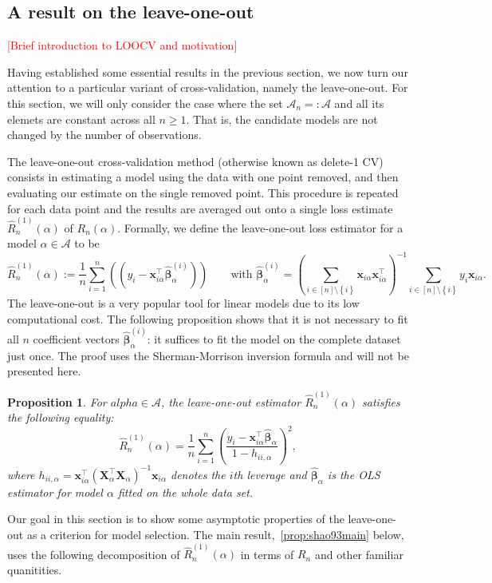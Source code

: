 \documentclass[11pt, letter paper]{article}
\newcommand{\1}{\mathmybb{1}}
\newtheorem{proposition}{Proposition}[section]
\newcommand{\0}{\emptyset}
\newcommand{\paren}[1]{\left(#1 \right)}
\newcommand{\set}[1]{\left\{ #1 \right\}}
\newcommand{\Acal}{\mathcal{A}_{n}}
\newcommand{\Tcal}{\mathcal{T}_{n}}
\newcommand{\X}{\boldsymbol{X}}
\newcommand{\x}{\boldsymbol{x}}
\newcommand{\bbetahat}{\boldsymbol{\hat{\beta}}}
\newcommand{\loocv}[1]{\hat{R}^{(1)}_{n}\paren{#1}}
\begin{document}
\subsection{A result on the leave-one-out}\label{sec:loo}
\renewcommand{\Acal}{\mathcal{A}}
\renewcommand{\Tcal}{\mathcal{T}}
\textcolor{red}{[Brief introduction to LOOCV and motivation]}

Having established some essential results in the previous section, we now turn our attention to a particular variant of cross-validation, namely the leave-one-out. For this section, we will only consider the case where the set \(\Acal_{n}=:\Acal\) and all its elemets are constant across all \(n\geq 1\). That is, the candidate models are not changed by the number of observations.

The leave-one-out cross-validation method (otherwise known as delete-1 CV) consists in estimating a model using the data with one point removed, and then evaluating our estimate on the single removed point. This procedure is repeated for each data point and the results are averaged out onto a single loss estimate \(\loocv{\alpha}\) of \(R_{n}(\alpha)\). Formally, we define the leave-one-out loss estimator for a model \(\alpha\in\Acal\) to be 
\[\loocv{\alpha} := \frac{1}{n}\sum_{i=1}^{n}\paren{(y_{i} - \x_{i\alpha}^{\top}\bbetahat_{\alpha}^{(i)})}\qquad\text{with }\bbetahat_{\alpha}^{(i)} = \paren{\sum_{i\in[n]\setminus\set{i}}\x_{i\alpha}\x_{i\alpha}^{\top}}^{-1} \sum_{i\in[n]\setminus\set{i}} y_{i}\x_{i\alpha}.\]
The leave-one-out is a very popular tool for linear models due to its low computational cost. The following proposition shows that it is not necessary to fit all \(n\) coefficient vectors \(\bbetahat_{\alpha}^{(i)}\): it suffices to fit the model on the complete dataset just once. The proof uses the Sherman-Morrison inversion formula and will not be presented here.

\begin{proposition}
    For \(alpha\in\Acal\), the leave-one-out estimator \(\loocv{\alpha}\) satisfies the following equality:
    \[\loocv{\alpha}= \frac{1}{n}\sum_{i=1}^{n}\paren{\frac{y_{i}-\x_{i\alpha}^{\top}\bbetahat_{\alpha}}{1-h_{ii,\alpha}}}^{2},\]
    where \(h_{ii,\alpha} = \x_{i\alpha}^{\top}{(\X_{\alpha}^{\top}\X_{\alpha})}^{-1}\x_{i\alpha}\) denotes the \(i\)th leverage and \(\bbetahat_{\alpha}\) is the OLS estimator for model \(\alpha\) fitted on the whole data set.
\end{proposition}

Our goal in this section is to show some asymptotic properties of the leave-one-out as a criterion for model selection. The main result,~\ref{prop:shao93main} below, uses the following decomposition of \(\loocv{\alpha}\) in terms of \(R_{n}\) and other familiar quanitities.
\end{document}
